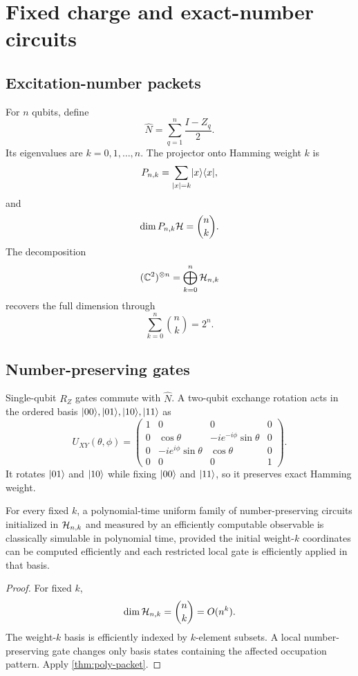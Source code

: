 \chapter{Fixed charge and exact-number circuits}
\label{ch:fixed-charge}

\section{Excitation-number packets}
For $n$ qubits, define
\[
\widehat N
=
\sum_{q=1}^n\frac{I-Z_q}{2}.
\]
Its eigenvalues are $k=0,1,\ldots,n$. The projector onto Hamming weight $k$ is
\[
P_{n,k}
=
\sum_{|x|=k}\lvert x\rangle\langle x\rvert,
\]
and
\[
\dim P_{n,k}\mathcal H
=
\binom nk.
\]
The decomposition
\[
(\mathbb C^2)^{\otimes n}
=
\bigoplus_{k=0}^n\mathcal H_{n,k}
\]
recovers the full dimension through
\[
\sum_{k=0}^n\binom nk=2^n.
\]

\section{Number-preserving gates}
Single-qubit $R_Z$ gates commute with $\widehat N$. A two-qubit exchange rotation acts in the ordered basis $\lvert 00\rangle,\lvert 01\rangle,\lvert 10\rangle,\lvert 11\rangle$ as
\[
U_{XY}(\theta,\phi)
=
\begin{pmatrix}
1&0&0&0\\
0&\cos\theta&-ie^{-i\phi}\sin\theta&0\\
0&-ie^{i\phi}\sin\theta&\cos\theta&0\\
0&0&0&1
\end{pmatrix}.
\]
It rotates $\lvert 01\rangle$ and $\lvert 10\rangle$ while fixing $\lvert 00\rangle$ and $\lvert 11\rangle$, so it preserves exact Hamming weight.

\begin{corollary}
\label{cor:fixed-charge-poly}
For every fixed $k$, a polynomial-time uniform family of number-preserving circuits initialized in $\mathcal H_{n,k}$ and measured by an efficiently computable observable is classically simulable in polynomial time, provided the initial weight-$k$ coordinates can be computed efficiently and each restricted local gate is efficiently applied in that basis.
\end{corollary}

\begin{proof}
For fixed $k$,
\[
\dim\mathcal H_{n,k}=\binom nk=O(n^k).
\]
The weight-$k$ basis is efficiently indexed by $k$-element subsets. A local number-preserving gate changes only basis states containing the affected occupation pattern. Apply \cref{thm:poly-packet}.
\end{proof}

